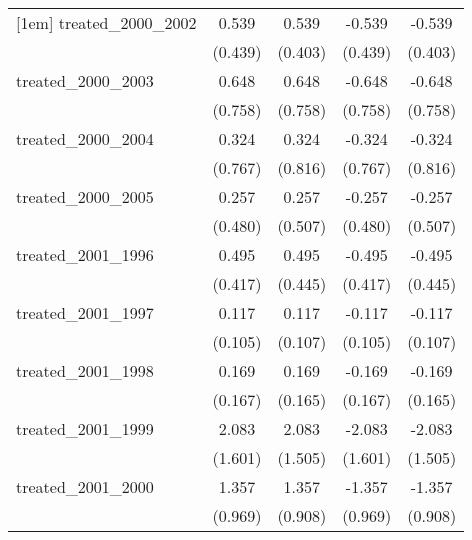 {\begin{tabular}{l*{4}{c}}
[1em]
treated\_2000\_2002&       0.539         &       0.539         &      -0.539         &      -0.539         \\
            &     (0.439)         &     (0.403)         &     (0.439)         &     (0.403)         \\
[1em]
treated\_2000\_2003&       0.648         &       0.648         &      -0.648         &      -0.648         \\
            &     (0.758)         &     (0.758)         &     (0.758)         &     (0.758)         \\
[1em]
treated\_2000\_2004&       0.324         &       0.324         &      -0.324         &      -0.324         \\
            &     (0.767)         &     (0.816)         &     (0.767)         &     (0.816)         \\
[1em]
treated\_2000\_2005&       0.257         &       0.257         &      -0.257         &      -0.257         \\
            &     (0.480)         &     (0.507)         &     (0.480)         &     (0.507)         \\
[1em]
treated\_2001\_1996&       0.495         &       0.495         &      -0.495         &      -0.495         \\
            &     (0.417)         &     (0.445)         &     (0.417)         &     (0.445)         \\
[1em]
treated\_2001\_1997&       0.117         &       0.117         &      -0.117         &      -0.117         \\
            &     (0.105)         &     (0.107)         &     (0.105)         &     (0.107)         \\
[1em]
treated\_2001\_1998&       0.169         &       0.169         &      -0.169         &      -0.169         \\
            &     (0.167)         &     (0.165)         &     (0.167)         &     (0.165)         \\
[1em]
treated\_2001\_1999&       2.083         &       2.083         &      -2.083         &      -2.083         \\
            &     (1.601)         &     (1.505)         &     (1.601)         &     (1.505)         \\
[1em]
treated\_2001\_2000&       1.357         &       1.357         &      -1.357         &      -1.357         \\
            &     (0.969)         &     (0.908)         &     (0.969)         &     (0.908)         \\

\end{tabular}}
